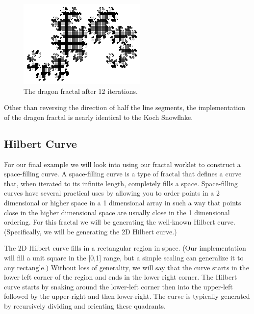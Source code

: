 \begin{figure}[tbp]
  \centering
  \includegraphics[width=\linewidth]{images/Dragon12}
  \caption{The dragon fractal after 12 iterations.}
  \label{fig:Dragon12}
\end{figure}

Other than reversing the direction of half the line segments, the implementation of the dragon fractal is nearly identical to the Koch Snowflake.



\subsection{Hilbert Curve}


For our final example we will look into using our fractal worklet to construct a space-filling curve.
A space-filling curve is a type of fractal that defines a curve that, when iterated to its infinite length, completely fills a space.
Space-filling curves have several practical uses by allowing you to order points in a 2 dimensional or higher space in a 1 dimensional array in such a way that points close in the higher dimensional space are usually close in the 1 dimensional ordering.
For this fractal we will be generating the well-known Hilbert curve.
(Specifically, we will be generating the 2D Hilbert curve.)

The 2D Hilbert curve fills in a rectangular region in space.
(Our implementation will fill a unit square in the [0,1] range, but a simple scaling can generalize it to any rectangle.)
Without loss of generality, we will say that the curve starts in the lower left corner of the region and ends in the lower right corner.
The Hilbert curve starts by snaking around the lower-left corner then into the upper-left followed by the upper-right and then lower-right.
The curve is typically generated by recursively dividing and orienting these quadrants.

